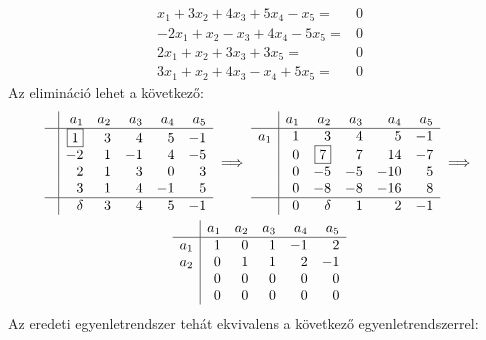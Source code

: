 \documentclass[9pt, a4paper, showtrims]{memoir}
\theoremstyle{plain}
\theoremstyle{remark}
\theoremstyle{definition}
\begin{document}
\begin{enumerate}
	      \[
		      \begin{array}{rl}
			      x_1+3x_2+4x_3+5x_4-x_5=  & 0 \\
			      -2x_1+x_2-x_3+4x_4-5x_5= & 0 \\
			      2x_1+x_2+3x_3+3x_5=      & 0 \\
			      3x_1+x_2+4x_3-x_4+5x_5=  & 0
		      \end{array}
	      \]
	      Az elimináció lehet a következő:
	      \begin{multline*}
		      \begin{array}{r|rrrrr}
			       & a_1       & a_2 & a_3 & a_4 & a_5 \\
			      \hline
			       & \boxed{1} & 3   & 4   & 5   & -1  \\
			       & -2        & 1   & -1  & 4   & -5  \\
			       & 2         & 1   & 3   & 0   & 3   \\
			       & 3         & 1   & 4   & -1  & 5   \\
			      \hline
			       & \delta    & 3   & 4   & 5   & -1
		      \end{array}
		      \implies
		      \begin{array}{r|rrrrr}
			          & a_1 & a_2       & a_3 & a_4 & a_5 \\
			      \hline
			      a_1 & 1   & 3         & 4   & 5   & -1  \\
			          & 0   & \boxed{7} & 7   & 14  & -7  \\
			          & 0   & -5        & -5  & -10 & 5   \\
			          & 0   & -8        & -8  & -16 & 8   \\
			      \hline
			          & 0   & \delta    & 1   & 2   & -1
		      \end{array}
		      \implies
		      \\
		      \begin{array}{r|rrrrr}
			          & a_1 & a_2 & a_3 & a_4 & a_5 \\
			      \hline
			      a_1 & 1   & 0   & 1   & -1  & 2   \\
			      a_2 & 0   & 1   & 1   & 2   & -1  \\
			          & 0   & 0   & 0   & 0   & 0   \\
			          & 0   & 0   & 0   & 0   & 0
		      \end{array}
	      \end{multline*}
	      Az eredeti egyenletrendszer tehát ekvivalens a következő egyenletrendszerrel:

\end{enumerate}
\end{document}
